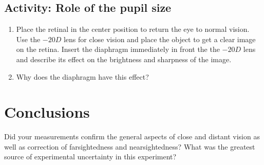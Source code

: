 \begin{multicols}{2}
\subsection{Activity: Role of the pupil size}
\begin{enumerate}
	 \item Place the retinal in the center position to return the eye to normal vision. Use the $-20 D$ lens for close vision and place the object to get a clear image on the retina. Insert the diaphragm immediately in front the the $-20 D$ lens and describe its effect on the brightness and sharpness of the image.
	 \item Why does the diaphragm have this effect?
\end{enumerate}

\section{Conclusions} Did your measurements confirm the general aspects of close and distant vision as well as correction of farsightedness and nearsightedness? What was the greatest source of experimental uncertainty in this experiment?

\end{multicols} 
\endinput
